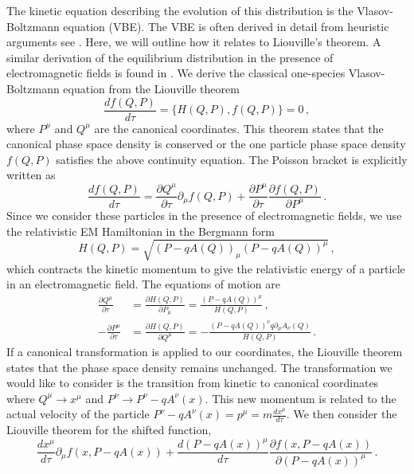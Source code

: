 The kinetic equation describing the evolution of this distribution is the Vlasov-Boltzmann equation (VBE). The VBE is often derived in detail from heuristic arguments see \cite{DeGroot:1980dk,Cercignani:2002bk}. Here, we will outline how it relates to Liouville's theorem. A similar derivation of the equilibrium distribution in the presence of electromagnetic fields is found in \cite{Hakim:2011bk}.
We derive the classical one-species Vlasov-Boltzmann equation from the Liouville theorem
\begin{equation}
    \frac{d f(Q,P)}{d\tau} = \{H(Q,P), f(Q,P)\} = 0\,,
\end{equation}
where $P^{\mu}$ and $Q^{\mu}$ are the canonical coordinates. 
This theorem states that the canonical phase space density is conserved or the one particle phase space density $f(Q,P)$ satisfies the above continuity equation.  The Poisson bracket is explicitly written as 
\begin{equation}
    \frac{d f(Q,P)}{d\tau} = \frac{\partial Q^{\mu}}{\partial \tau}\partial_\mu f(Q,P) + \frac{\partial P^{\mu}}{\partial \tau}\frac{\partial f(Q,P)}{\partial P^{\mu}}\,.
\end{equation}
Since we consider these particles in the presence of electromagnetic fields, we use the relativistic EM Hamiltonian in the Bergmann form
\begin{equation}
    H(Q,P) = \sqrt{(P-q A(Q))_\mu(P-q A(Q))^\mu}\,,
\end{equation}
which contracts the kinetic momentum to give the relativistic energy of a particle in an electromagnetic field. The equations of motion are
\begin{align}
    \frac{\partial Q^{\mu}}{\partial \tau} &= \frac{\partial H(Q,P)}{\partial P_{\mu}}= \frac{(P-q A(Q))^{\mu}}{H(Q,P)}\,,\\
   -\frac{\partial P^{\mu}}{\partial \tau} &= \frac{\partial H(Q,P)}{\partial Q^{\mu}}= - \frac{(P-q A(Q))^{\nu}q \partial_\mu A_\nu(Q)}{H(Q,P)}\,.
\end{align}
If a canonical transformation is applied to our coordinates, the Liouville theorem states that the phase space density remains unchanged. 
The transformation we would like to consider is the transition from kinetic to canonical coordinates where $Q^{\mu}\rightarrow x^{\mu}$ and  $P^{\nu} \rightarrow P^{\nu} - q A^{\nu}(x)$. This new momentum is related to the actual velocity of the particle $P^{\nu} - q A^{\nu}(x) = p^{\mu} = m\frac{d x^{\mu}}{d \tau}$.  We then consider the Liouville theorem for the shifted function,  
\begin{equation}
 \frac{d x^{\mu}}{d \tau}\partial_\mu f(x,P-q A(x)) + \frac{d (P-q A(x))^{\mu}}{d \tau}\frac{\partial f(x,P-q A(x))}{\partial (P-q A(x))^{\mu}}\,.
\end{equation}
